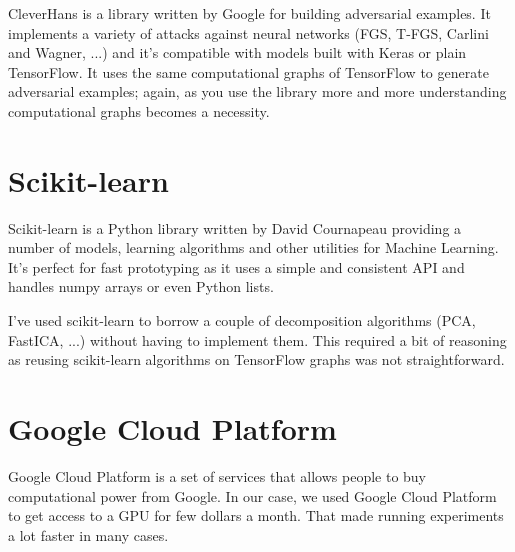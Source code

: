 CleverHans is a library written by Google for building adversarial
examples. It implements a variety of attacks against neural networks
(FGS, T-FGS, Carlini and Wagner, ...) and it's compatible with models
built with Keras or plain TensorFlow. It uses the same computational
graphs of TensorFlow to generate adversarial examples; again, as you
use the library more and more understanding computational graphs
becomes a necessity.

\section{Scikit-learn}
\label{sec:sklearn}

Scikit-learn is a Python library written by David Cournapeau providing
a number of models, learning algorithms and other utilities for Machine
Learning. It's perfect for fast prototyping as it uses a simple and
consistent API and handles numpy arrays or even Python lists.

I've used scikit-learn to borrow a couple of decomposition algorithms
(PCA, FastICA, ...) without having to implement them. This required a
bit of reasoning as reusing scikit-learn algorithms on TensorFlow
graphs was not straightforward.

\section{Google Cloud Platform}
\label{sec:google-cloud-platform}

Google Cloud Platform is a set of services that allows people to buy
computational power from Google. In our case, we used Google Cloud
Platform to get access to a GPU for few dollars a month. That made
running experiments a lot faster in many cases.
